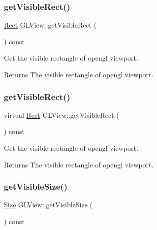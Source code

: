 \subsubsection{\texorpdfstring{get\+Visible\+Rect()}{getVisibleRect()}\hspace{0.1cm}{\footnotesize\ttfamily [1/2]}}
{\footnotesize\ttfamily \hyperlink{classRect}{Rect} G\+L\+View\+::get\+Visible\+Rect (\begin{DoxyParamCaption}{ }\end{DoxyParamCaption}) const\hspace{0.3cm}{\ttfamily [virtual]}}

Get the visible rectangle of opengl viewport.

\begin{DoxyReturn}{Returns}
The visible rectangle of opengl viewport. 
\end{DoxyReturn}
\mbox{\label{classGLView_a48ef3d920aea2744c7f48db26b1da1c4}} 
\subsubsection{\texorpdfstring{get\+Visible\+Rect()}{getVisibleRect()}\hspace{0.1cm}{\footnotesize\ttfamily [2/2]}}
{\footnotesize\ttfamily virtual \hyperlink{classRect}{Rect} G\+L\+View\+::get\+Visible\+Rect (\begin{DoxyParamCaption}{ }\end{DoxyParamCaption}) const\hspace{0.3cm}{\ttfamily [virtual]}}

Get the visible rectangle of opengl viewport.

\begin{DoxyReturn}{Returns}
The visible rectangle of opengl viewport. 
\end{DoxyReturn}
\mbox{\label{classGLView_a0f947fc229b184153cb67e9437244c7b}} 
\subsubsection{\texorpdfstring{get\+Visible\+Size()}{getVisibleSize()}\hspace{0.1cm}{\footnotesize\ttfamily [1/2]}}
{\footnotesize\ttfamily \hyperlink{classSize}{Size} G\+L\+View\+::get\+Visible\+Size (\begin{DoxyParamCaption}{ }\end{DoxyParamCaption}) const\hspace{0.3cm}{\ttfamily [virtual]}}

